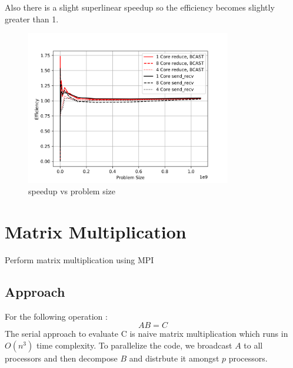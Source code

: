 \documentclass[12,a4paper]{article}
\begin{document}
    Also there is a slight superlinear speedup so the efficiency becomes slightly greater than 1.
    
    \begin{figure}[H]
        \centering
        \includegraphics[width=0.8\textwidth]{plots/efficiency_size.png}
        \caption{speedup vs problem size}
        \label{fig:q2}
    \end{figure}
    \section{Matrix Multiplication}
    Perform matrix multiplication using MPI
    \subsection{Approach}
    For the following operation :
    \begin{equation}\nonumber
        AB=C
    \end{equation}
    The serial approach to evaluate C is naive matrix multiplication which runs in $O(n^3)$ time complexity. To parallelize the code, we broadcast $A$ to all processors and then decompose $B$ and distrbute it amongst $p$ processors.
\end{document}
